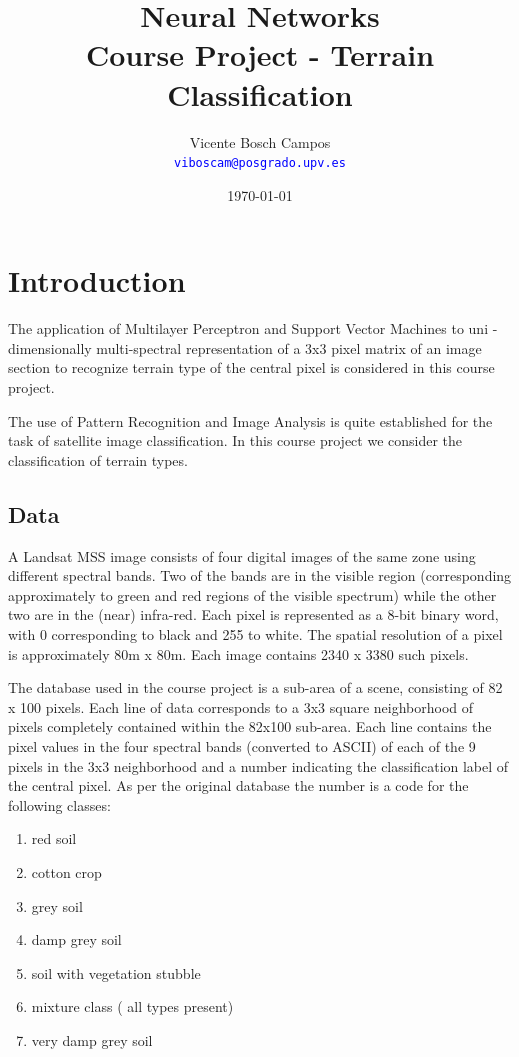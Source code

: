 \documentclass[a4paper,10pt,titlepage]{article}
\title{Neural Networks \\ Course Project - Terrain Classification}
\author{Vicente Bosch Campos \dag \\
\textcolor{blue}{\texttt{viboscam@posgrado.upv.es}}}
\date{\today}
\begin{document}
\ifpdf
{}
\else
{}
\fi

\maketitle

\tableofcontents

\listoffigures

\section{Introduction}

\par The application of Multilayer Perceptron and Support Vector Machines to uni - dimensionally multi-spectral representation of a 3x3 pixel matrix of an image section to recognize terrain type of the central pixel is considered in this course project.
\\
\par The use of Pattern Recognition and Image Analysis is quite established for the task of satellite image classification. In this course project we consider the classification of terrain types.


\subsection{Data}


\par A Landsat MSS image consists of four digital images of the same zone using different spectral bands. Two of the bands are in the visible region (corresponding approximately to green and red regions of the visible spectrum) while the other two are in the (near) infra-red. Each pixel is represented as a 8-bit binary word, with 0 corresponding to black and 255 to white. The spatial resolution of a pixel is approximately 80m x 80m. Each image contains 2340 x 3380 such pixels.
\\
\par The database used in the course project is a sub-area of a scene, consisting of 82 x 100 pixels. Each line of data corresponds to a 3x3 square neighborhood of pixels completely contained within the 82x100 sub-area. Each line contains the pixel values in the four spectral bands (converted to ASCII) of each of the 9 pixels in the 3x3 neighborhood and a number indicating the classification label of the central pixel. As per the original database the number is a code for the following classes:
\begin{enumerate}
	\item red soil
	\item cotton crop
	\item grey soil
	\item damp grey soil
	\item soil with vegetation stubble
	\item mixture class ( all types present)
	\item very damp grey soil
\end{enumerate}
\end{document}
